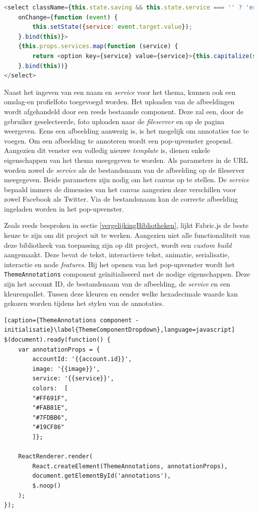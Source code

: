 \begin{lstlisting}[caption={Theme component - Dropdown},label=lst:ThemeComponentDropdown,language=javascript]
<select className={this.state.saving && this.state.service === '' ? 'error 		fieldset-input' : 'fieldset-input'} id="service" name="service" ref="service" value={this.getService()}
	onChange={function (event) {
		this.setState({service: event.target.value});
	}.bind(this)}>
	{this.props.services.map(function (service) {
		return <option key={service} value={service}>{this.capitalize(service)}</option>
	}.bind(this))}
</select>
\end{lstlisting}

Naast het ingeven van een naam en \textit{service} voor het thema, kunnen ook een omslag-en profielfoto toegevoegd worden. Het uploaden van de afbeeldingen wordt afgehandeld door een reeds bestaande component. Deze zal een, door de gebruiker geselecteerde, foto uploaden naar de \textit{fileserver} en op de pagina weergeven. Eens een afbeelding aanwezig is, is het mogelijk om annotaties toe te voegen. Om een afbeelding te annoteren wordt een pop-upvenster geopend. Aangezien dit venster een volledig nieuwe \textit{template} is, dienen enkele eigenschappen van het thema meegegeven te worden. Als parameters in de URL worden zowel de \textit{service} als de bestandsnaam van de afbeelding op de fileserver meegegeven. Beide parameters zijn nodig om het canvas op te stellen. De \textit{service} bepaald immers de dimensies van het canvas aangezien deze verschillen voor zowel Facebook als Twitter. Via de bestandsnaam kan de correcte afbeelding ingeladen worden in het pop-upvenster.

Zoals reeds besproken in sectie \ref{vergelijkingBibliotheken}, lijkt Fabric.js de beste keuze te zijn om dit project uit te werken. Aangezien niet alle functionaliteit van deze bibliotheek van toepassing zijn op dit project, wordt een \textit{custom build} aangemaakt. Deze bevat de tekst, interactieve tekst, animatie, serialisatie, interactie en node \textit{features}. Bij het openen van het pop-upvenster wordt het \texttt{ThemeAnnotations} component ge\"{i}nitialiseerd met de nodige eigenschappen. Deze zijn het account ID, de bestandsnaam van de afbeelding, de \textit{service} en een kleurenpallet. Tussen deze kleuren en eender welke hexadecimale waarde kan gekozen worden tijdens het stylen van de annotaties.

\begin{lstlisting}[caption={ThemeAnnotations component - initialisatie}\label{ThemeComponentDropdown},language=javascript]
$(document).ready(function() {
	var annotationProps = {
		accountId: '{{account.id}}',
		image: '{{image}}',
		service: '{{service}}',
		colors:  [
		"#FF691F",
		"#FAB81E",
		"#7FDBB6",
		"#19CF86"
		]};
		
	ReactRenderer.render(
		React.createElement(ThemeAnnotations, annotationProps),
		document.getElementById('annotations'),
		$.noop()
	);
});
\end{lstlisting}

